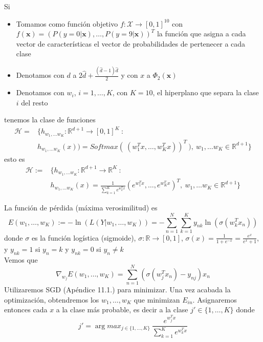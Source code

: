 \documentclass[11pt,a4paper]{article}
\theoremstyle{definition}
\newcommand{\R}{\mathbb{R}}
\begin{document}
	Si 
	\begin{itemize}
	\item Tomamos como función objetivo $f\colon \mathcal{X} \to [0,1]^{10}$ con $f(\mathbf{x})=(P(y=0|\mathbf{x}),\ldots, P(y=9|\mathbf{x}))^T$ la función que asigna a cada vector de características el vector de probabilidades de pertenecer a cada clase 
	\item Denotamos con $d$ a $2\hat d + \frac{(\hat d -1)\hat d}{2}$ y con $x$ a $\Phi_2(\mathbf{x})$
	\item Denotamos con $w_i$, $i=1,\ldots , K$, con $K=10$, el hiperplano que separa la clase $i$ del resto
	\end{itemize}
	tenemos la clase de funciones
	\begin{equation*}
\begin{aligned}
\mathcal{H}= & \Big\{h_{w_1,\ldots w_K} \colon \R^{d+1} \to [0,1]^K \ : \\
      & h_{w_1,\ldots w_K} (x))=Softmax(\ (w_1^T x, \ldots, w_K^T x))^T \ ),\ w_1,\ldots w_K \in \R^{d+1}\Big\}
      \end{aligned}
\end{equation*}
	esto es
      \begin{equation*}
\begin{aligned}
      \mathcal{H}:=& \Big\{h_{w_1,\ldots w_K} \colon \R^{d+1} \to \R^K \ :\\
      & h_{w_1,\ldots w_K} (x)=\frac{1}{\sum_{k=1}^K e^{w_k^T x}}(e^{w_1^T x}, \ldots, e^{w_K^T x})^T,\ w_1,\ldots w_K \in \R^{d+1}\Big\}
\end{aligned}
\end{equation*}
	
	
	La función de pérdida (máxima verosimilitud) es
	$$E(w_1,\ldots,w_K):=-\ln \left( L(Y|w_1,\ldots ,w_K) \right)=-\sum_{n=1}^N \sum_{k=1}^K y_{nk} \ln \left( \sigma(w_k^T x_n) \right)$$
	donde $\sigma$ es la función logística (sigmoide), $\sigma\colon \R \to [0,1]$, $\sigma(x)=\frac{1}{1+e^{-x}}=\frac{e^x}{e^x+1}$, y $y_{nk} =1$ si $y_n=k$ y $y_{nk}=0$ si $y_n\neq k$\\
	Vemos que
	$$\nabla_{w_j} E(w_1,\ldots,w_K)=\sum_{n=1}^N (\sigma(w_j^T x_n)-y_{nj}) x_n$$
	Utilizaremos SGD (Apéndice 11.1.) para minimizar. Una vez acabada la optimización, obtendremos los $w_1,\ldots ,w_K$ que minimizan $E_{in}$. %
	 Asignaremos entonces cada $x$ a la clase más probable, es decir a la clase $ j'\in \{1,\ldots,K\}$ donde
	 $$j'= \arg max_{j\in \{1,\ldots, K\}} \  \frac{e^{w_j^Tx}}{\sum_{k=1}^K e^{w_k^Tx}}$$
\end{document}
